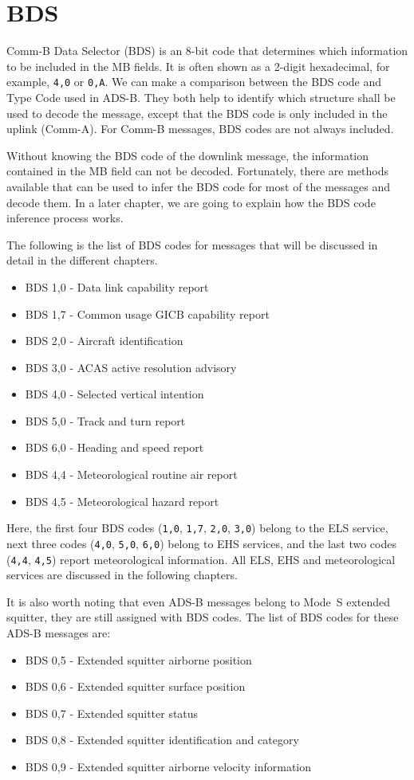 \section{BDS}

Comm-B Data Selector (BDS) is an 8-bit code that determines which information to be included in the MB fields. It is often shown as a 2-digit hexadecimal, for example, \texttt{4,0} or \texttt{0,A}. We can make a comparison between the BDS code and Type Code used in ADS-B. They both help to identify which structure shall be used to decode the message, except that the BDS code is only included in the uplink (Comm-A). For Comm-B messages, BDS codes are not always included.

Without knowing the BDS code of the downlink message, the information contained in the MB field can not be decoded. Fortunately, there are methods available that can be used to infer the BDS code for most of the messages and decode them. In a later chapter, we are going to explain how the BDS code inference process works.

The following is the list of BDS codes for messages that will be discussed in detail in the different chapters.

\begin{itemize}
  \item BDS 1,0 - Data link capability report
  \item BDS 1,7 - Common usage GICB capability report
  \item BDS 2,0 - Aircraft identification
  \item BDS 3,0 - ACAS active resolution advisory
  \item BDS 4,0 - Selected vertical intention
  \item BDS 5,0 - Track and turn report
  \item BDS 6,0 - Heading and speed report
  \item BDS 4,4 - Meteorological routine air report
  \item BDS 4,5 - Meteorological hazard report
\end{itemize}

Here, the first four BDS codes (\texttt{1,0}, \texttt{1,7}, \texttt{2,0}, \texttt{3,0}) belong to the ELS service, next three codes (\texttt{4,0}, \texttt{5,0}, \texttt{6,0}) belong to EHS services, and the last two codes (\texttt{4,4}, \texttt{4,5}) report meteorological information. All ELS, EHS and meteorological services are discussed in the following chapters.

It is also worth noting that even ADS-B messages belong to Mode~S extended squitter, they are still assigned with BDS codes. The list of BDS codes for these ADS-B messages are:

\begin{itemize}
  \item BDS 0,5 - Extended squitter airborne position
  \item BDS 0,6 - Extended squitter surface position
  \item BDS 0,7 - Extended squitter status
  \item BDS 0,8 - Extended squitter identification and category
  \item BDS 0,9 - Extended squitter airborne velocity information
\end{itemize}